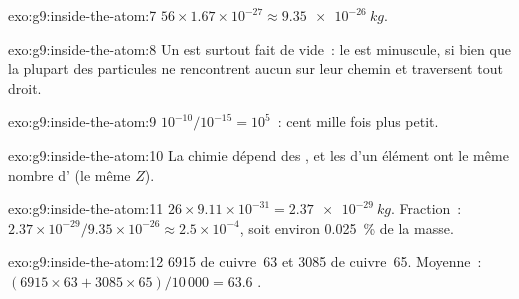 \begin{solution}{exo:g9:inside-the-atom:7}
$56 \times 1.67 \times 10^{-27} \approx \qty{9.35e-26}{kg}$.
\end{solution}

\begin{solution}{exo:g9:inside-the-atom:8}
Un  est surtout fait de vide~: le  est minuscule, si bien que
la plupart des particules ne rencontrent aucun  sur leur chemin et
traversent tout droit.
\end{solution}

\begin{solution}{exo:g9:inside-the-atom:9}
$10^{-10} / 10^{-15} = 10^{5}$~: cent mille fois plus petit.
\end{solution}

\begin{solution}{exo:g9:inside-the-atom:10}
La chimie dépend des , et les  d'un élément ont le même
nombre d' (le même $Z$).
\end{solution}

\begin{solution}{exo:g9:inside-the-atom:11}
$26 \times 9.11 \times 10^{-31} = \qty{2.37e-29}{kg}$. Fraction~:
$2.37 \times 10^{-29} / 9.35 \times 10^{-26} \approx 2.5 \times
10^{-4}$, soit environ \qty{0.025}{\percent} de la masse.
\end{solution}

\begin{solution}{exo:g9:inside-the-atom:12}
6915  de cuivre~63 et 3085  de cuivre~65. Moyenne~:
$(6915 \times 63 + 3085 \times 65)/10\,000 = 63.6$ .
\end{solution}

